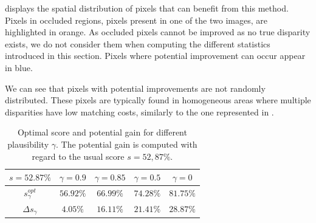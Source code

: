  displays the spatial distribution of pixels that can benefit from this method. Pixels in occluded regions, \ie pixels present in one of the two images, are highlighted in orange. As occluded pixels cannot be improved as no true disparity exists, we do not consider them when computing the different statistics introduced in this section. Pixels where potential improvement can occur appear in blue.

We can see that pixels with potential improvements are not randomly distributed. These pixels are typically found in homogeneous areas where multiple disparities have low matching costs, similarly to the one represented in .

\begin{table}[ht]
\centering
\begin{tabular}{|c|c|c|c|c|}
\hline
\rowcolor[HTML]{C0C0C0} 
$s=52.87\%$                                & $\gamma=0.9$ & $\gamma=0.85$ & $\gamma=0.5$ & $\gamma=0$ \\ \hline
\cellcolor[HTML]{C0C0C0}$s_\gamma^{opt}$   & $56.92\%$    & $66.99\%$     & $74.28\%$    & $81.75\%$  \\ \hline
\cellcolor[HTML]{C0C0C0}$\Delta s_\gamma$ & $4.05\%$     & $16.11\%$     & $21.41\%$    & $28.87\%$  \\ \hline
\end{tabular}
\caption{Optimal score and potential gain for different plausibility $\gamma$. The potential gain is computed with regard to the usual score $s=52,87\%$.}\label{tab:optimal_score}
\end{table}

